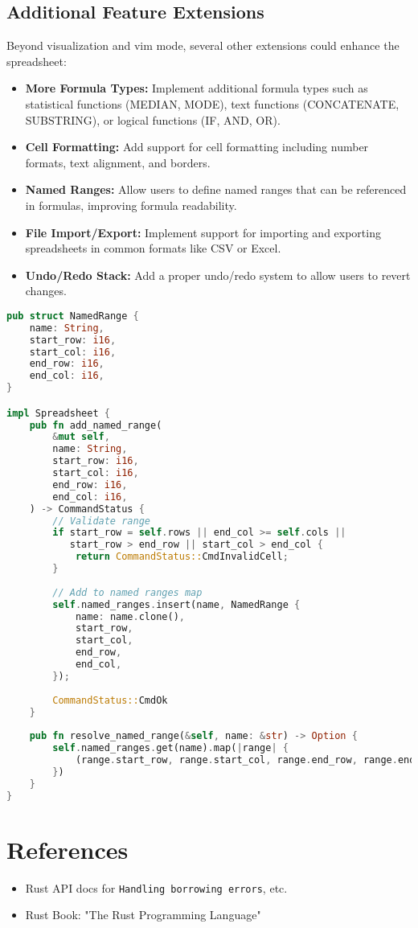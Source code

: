\documentclass[11pt,a4paper]{article}
\begin{document}
\subsection{Additional Feature Extensions}

Beyond visualization and vim mode, several other extensions could enhance the spreadsheet:

\begin{itemize}
  \item \textbf{More Formula Types:} Implement additional formula types such as statistical functions (MEDIAN, MODE), text functions (CONCATENATE, SUBSTRING), or logical functions (IF, AND, OR).
  
  \item \textbf{Cell Formatting:} Add support for cell formatting including number formats, text alignment, and borders.
  
  \item \textbf{Named Ranges:} Allow users to define named ranges that can be referenced in formulas, improving formula readability.
  
  \item \textbf{File Import/Export:} Implement support for importing and exporting spreadsheets in common formats like CSV or Excel.
  
  \item \textbf{Undo/Redo Stack:} Add a proper undo/redo system to allow users to revert changes.
\end{itemize}

\begin{lstlisting}[language=Rust, caption={Implementation of named ranges}, label=lst:named-ranges]
pub struct NamedRange {
    name: String,
    start_row: i16,
    start_col: i16,
    end_row: i16,
    end_col: i16,
}

impl Spreadsheet {
    pub fn add_named_range(
        &mut self,
        name: String,
        start_row: i16,
        start_col: i16,
        end_row: i16,
        end_col: i16,
    ) -> CommandStatus {
        // Validate range
        if start_row = self.rows || end_col >= self.cols ||
           start_row > end_row || start_col > end_col {
            return CommandStatus::CmdInvalidCell;
        }
        
        // Add to named ranges map
        self.named_ranges.insert(name, NamedRange {
            name: name.clone(),
            start_row,
            start_col,
            end_row,
            end_col,
        });
        
        CommandStatus::CmdOk
    }
    
    pub fn resolve_named_range(&self, name: &str) -> Option {
        self.named_ranges.get(name).map(|range| {
            (range.start_row, range.start_col, range.end_row, range.end_col)
        })
    }
}
\end{lstlisting}

\section*{References}
\begin{itemize}
  \item Rust API docs for \texttt{Handling borrowing errors}, etc.
  
  \item Rust Book: "The Rust Programming Language" 
\end{itemize}
\end{document}
